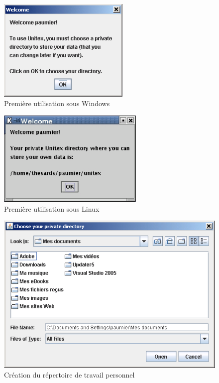 \begin{figure}[h]
\begin{center}
\includegraphics[width=6.3cm]{resources/img/fig1-1.png}
\caption{Première utilisation sous Windows}
\end{center}
\end{figure}

\begin{figure}[h]
\begin{center}
\includegraphics[width=7cm]{resources/img/fig1-2.png}
\caption{Première utilisation sous Linux}
\end{center}
\end{figure}

\begin{figure}[h]
\begin{center}
\includegraphics[width=13cm]{resources/img/fig1-3.png}
\caption{Création du répertoire de travail personnel
\label{fig-creation-personal-directory}}
\end{center}
\end{figure}



